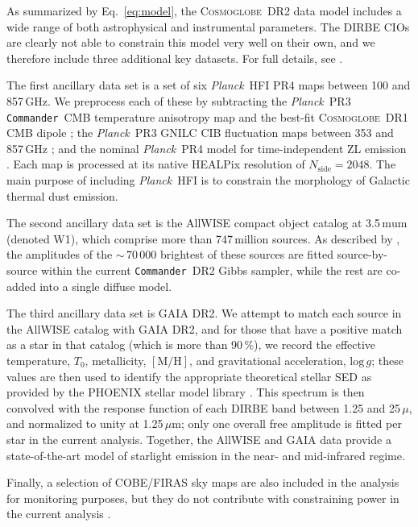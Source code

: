 \documentclass[twocolumn]{aa}
\def\commander{\texttt{Commander}}
\def\Planck{\textit{Planck}}
\newcommand{\cosmoglobe}{\textsc{Cosmoglobe}}
\begin{document}
As summarized by Eq.~\eqref{eq:model}, the \cosmoglobe\ DR2 data model
includes a wide range of both astrophysical and instrumental
parameters. The DIRBE CIOs are clearly not able to constrain this
model very well on their own, and we therefore include three
additional key datasets. For full details, see
\citet{CG02_01,CG02_03,CG02_04,CG02_05}.

The first ancillary data set is a set of six \Planck\ HFI PR4 maps
between 100 and 857\,GHz. We preprocess each of these by subtracting
the \Planck\ PR3 \commander\ CMB temperature anisotropy map
\citep{planck2014-a12} and the best-fit \cosmoglobe\ DR1 CMB dipole
\citep{Watts2023}; the \Planck\ PR3 GNILC CIB fluctuation maps between
353 and 857\,GHz \citep{gnilc_cib}; and the nominal \Planck\ PR4 model
for time-independent ZL emission \citep{npipe}. Each map is processed
at its native HEALPix resolution of $N_{\mathrm{side}}=2048$. The main
purpose of including \Planck\ HFI is to constrain the morphology of
Galactic thermal dust emission.

The second ancillary data set is the AllWISE
\citep{wright:2010,allwise_ES} compact object catalog at
3.5$\,\mathrm{mu}$m (denoted W1), which comprise more than
747\,million sources. As described by \citet{CG02_04}, the amplitudes
of the $\sim$\,70\,000 brightest of these sources are fitted
source-by-source within the current \commander\ DR2 Gibbs sampler,
while the rest are co-added into a single diffuse model.

The third ancillary data set is GAIA DR2. We attempt to match each
source in the AllWISE catalog with GAIA DR2, and for those that have a
positive match as a star in that catalog (which is more than 90\,\%),
we record the effective temperature, $T_0$, metallicity,
$[\mathrm{M}/\mathrm{H}]$, and gravitational acceleration,
$\mathrm{log}\,g$; these values are then used to identify the
appropriate theoretical stellar SED as provided by the PHOENIX stellar
model library \citep{husser:2013}. This spectrum is then convolved
with the response function of each DIRBE band between 1.25 and
25\,$\mu$, and normalized to unity at 1.25\,$\mu$m; only one overall
free amplitude is fitted per star in the current analysis. Together,
the AllWISE and GAIA data provide a state-of-the-art model of
starlight emission in the near- and mid-infrared regime.

Finally, a selection of COBE/FIRAS \citep{mather:1994} sky maps are
also included in the analysis for monitoring purposes,
but they do not contribute with constraining power in the current
analysis \citep{CG02_01}.
\end{document}
